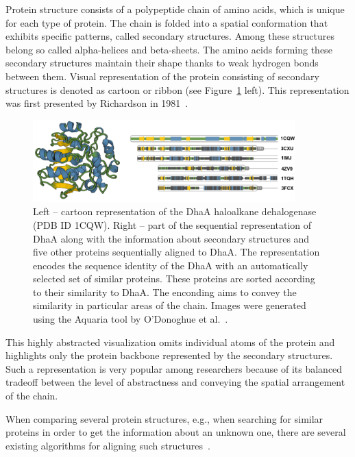 \documentclass[twocolumn]{bmcart}%
\begin{document}
Protein structure consists of a polypeptide chain of amino acids, which is unique for each type of protein. 
The chain is folded into a spatial conformation that exhibits specific patterns, called secondary structures.
Among these structures belong so called alpha-helices and beta-sheets. 
The amino acids forming these secondary structures maintain their shape thanks to weak hydrogen bonds between them.
Visual representation of the protein consisting of secondary structures is denoted as cartoon or ribbon (see Figure~\ref{fig:aquaria} left).
This representation was first presented by Richardson in 1981~\cite{Richardson1981}.


\begin{figure}[th]
  \centering
  \includegraphics[width=0.9\textwidth]{pics/aquaria2.png}
  \caption{Left -- cartoon representation of the DhaA haloalkane dehalogenase (PDB ID 1CQW). Right -- part of the sequential representation of DhaA along with the information about secondary structures and five other proteins sequentially aligned to DhaA. The representation encodes the sequence identity of the DhaA with an automatically selected set of similar proteins. These proteins are sorted according to their similarity to DhaA. The enconding aims to convey the similarity in particular areas of the chain. Images were generated using the Aquaria tool by O'Donoghue et al.~\cite{odonoghue2015}.}
  \label{fig:aquaria}
\end{figure}

This highly abstracted visualization omits individual atoms of the protein and highlights only the protein backbone represented by the secondary structures.
Such a representation is very popular among researchers because of its balanced tradeoff between the level of abstractness and conveying the spatial arrangement of the chain.

When comparing several protein structures, e.g., when searching for similar proteins in order to get the information about an unknown one, there are several existing algorithms for aligning such structures~\cite{dali,Shindyalov1998,ssap,tmalign,promals3d}.
\end{document}
